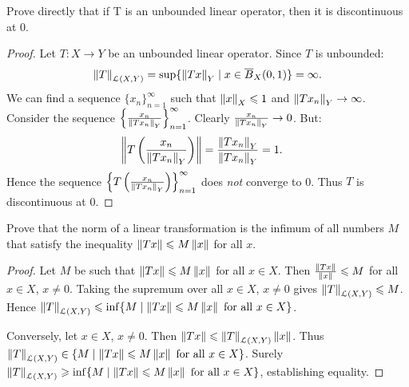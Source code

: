 \begin{exercise}
Prove directly that if T is an unbounded linear operator, then it is discontinuous at 0.
\end{exercise}
    \begin{proof}
        Let $T:X \rightarrow Y$ be an unbounded linear operator. Since $T$ is unbounded:
            \begin{equation*}
            \begin{split}
                \left\lVert T \right\rVert_{\mathcal{L}(X,Y)} = \sup\{\left\lVert Tx \right\rVert_Y \mid x \in \overline{B}_X(0,1)\} = \infty.
            \end{split}
            \end{equation*}
        We can find a sequence $\{x_n\}_{n = 1}^\infty$ such that $\left\lVert x \right\rVert_X \leqslant 1$ and $\left\lVert T x_n \right\rVert_Y \rightarrow \infty$. Consider the sequence $\left\{ \frac{x_n}{\left\lVert T x_n \right\rVert_Y} \right\}_{n = 1}^\infty$. Clearly $\frac{x_n}{\left\lVert T x_n \right\rVert_Y} \rightarrow 0$. But:
            \begin{equation*}
            \begin{split}
                \left\lVert T \left( \frac{x_n}{\left\lVert T x_n \right\rVert_Y} \right) \right\rVert
                & = \frac{\left\lVert T x_n \right\rVert_Y}{\left\lVert T x_n \right\rVert_Y} = 1.
            \end{split}
            \end{equation*}
        Hence the sequence $\left\{ T \left( \frac{x_n}{\left\lVert T x_n \right\rVert_Y} \right) \right\}_{n = 1}^\infty$ does \textit{not} converge to 0. Thus $T$ is discontinuous at 0. 
    \end{proof}

\begin{exercise}
Prove that the norm of a linear transformation is the infimum of all numbers $M$ that satisfy the inequality $\left\lVert Tx \right\rVert \leqslant M \left\lVert x \right\rVert$ for all $x$.
\end{exercise}
    \begin{proof}
        Let $M$ be such that $\left\lVert Tx \right\rVert \leqslant M \left\lVert x \right\rVert$ for all $x \in X$. Then $\frac{\left\lVert Tx \right\rVert}{\left\lVert x \right\rVert} \leqslant M$ for all $x \in X$, $x \neq 0$. Taking the supremum over all $x \in X$, $x \neq 0$ gives $\left\lVert T \right\rVert_{\mathcal{L}(X,Y)} \leqslant M$. Hence $\left\lVert T \right\rVert_{\mathcal{L}(X,Y)} \leqslant \inf\{M \mid \left\lVert Tx \right\rVert \leqslant M \left\lVert x \right\rVert \text{ for all }x \in X\}$.

        Conversely, let $x \in X$, $x \neq 0$. Then $\left\lVert Tx \right\rVert \leqslant \left\lVert T \right\rVert_{\mathcal{L}(X,Y)} \left\lVert x \right\rVert$. Thus $\left\lVert T \right\rVert_{\mathcal{L}(X,Y)} \in \{M \mid \left\lVert Tx \right\rVert \leqslant M \left\lVert x \right\rVert \text{ for all }x \in X\}$. Surely $\left\lVert T \right\rVert_{\mathcal{L}(X,Y)} \geqslant \inf\{M \mid \left\lVert Tx \right\rVert \leqslant M \left\lVert x \right\rVert \text{ for all }x \in X\}$, establishing equality.
    \end{proof}

